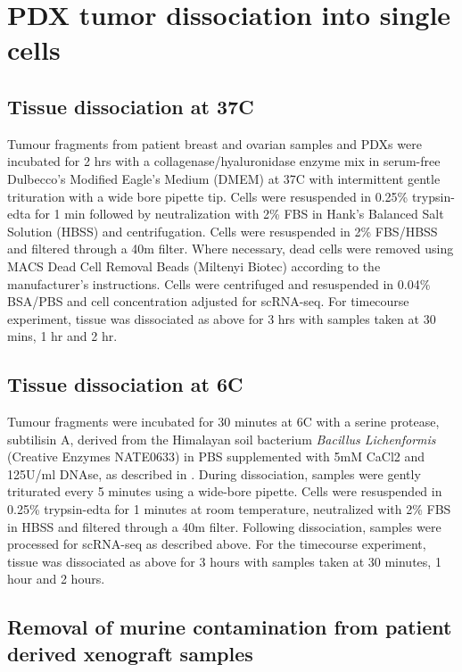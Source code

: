 \section{PDX tumor dissociation into single cells}

\subsection{Tissue dissociation at 37\textdegree C}
Tumour fragments from patient breast and ovarian samples and PDXs were incubated for 2 hrs with a collagenase/hyaluronidase enzyme mix in serum-free Dulbecco's Modified Eagle's Medium (DMEM) at 37\textdegree C with intermittent gentle trituration with a wide bore pipette tip. Cells were resuspended in 0.25\% trypsin-edta for 1 min followed by neutralization with 2\% FBS in Hank's Balanced Salt Solution (HBSS) and centrifugation. Cells were resuspended in 2\% FBS/HBSS and filtered through a 40\textmu m filter. Where necessary, dead cells were removed using MACS Dead Cell Removal Beads (Miltenyi Biotec) according to the manufacturer's instructions. Cells were centrifuged and resuspended in 0.04\%  BSA/PBS and cell concentration adjusted for scRNA-seq. For timecourse experiment, tissue was dissociated as above for 3 hrs with samples taken at 30 mins, 1 hr and 2 hr.

\subsection{Tissue dissociation at 6\textdegree C}
Tumour fragments were incubated for 30 minutes at 6\textdegree C with a serine protease, subtilisin A, derived from the Himalayan soil bacterium \textit{Bacillus Lichenformis} (Creative Enzymes NATE0633) in PBS supplemented with 5mM CaCl2 and 125U/ml DNAse, as described in \cite{adam2017psychrophilic, potter2019dissociation}. During dissociation, samples were gently triturated every 5 minutes using a wide-bore pipette. Cells were resuspended in 0.25\% trypsin-edta for 1 minutes at room temperature, neutralized with 2\% FBS in HBSS and filtered through a 40\textmu m filter. Following dissociation, samples were processed for scRNA-seq as described above. For the timecourse experiment, tissue was dissociated as above for 3 hours with samples taken at 30 minutes, 1 hour and 2 hours. 

\subsection{Removal of murine contamination from patient derived xenograft samples}

